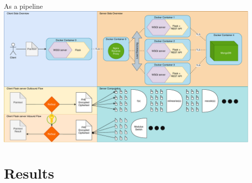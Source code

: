 \documentclass[aspectratio=169]{beamer}
\begin{document}
    \begin{frame}{As a pipeline}
      \includegraphics[width=0.85\linewidth]{nextgen.pdf}
    \end{frame}

  \section{Results}
\end{document}
